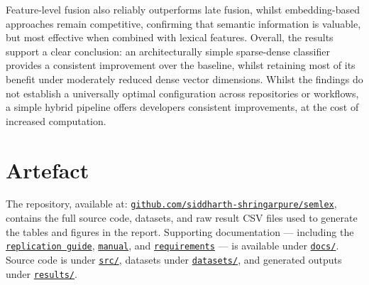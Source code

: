 \documentclass[10pt,a4paper]{article}
\begin{document}
Feature-level fusion also reliably outperforms late fusion, whilst embedding-based approaches remain competitive, confirming that semantic information is valuable, but most effective when combined with lexical features. Overall, the results support a clear conclusion: an architecturally simple sparse-dense classifier provides a consistent improvement over the baseline, whilst retaining most of its benefit under moderately reduced dense vector dimensions. Whilst the findings do not establish a universally optimal configuration across repositories or workflows, a simple hybrid pipeline offers developers consistent improvements, at the cost of increased computation.


\section{Artefact}

The repository, available at: \href{https://github.com/siddharth-shringarpure/semlex}{\texttt{github.com/siddharth-shringarpure/semlex}}, contains the full source code, datasets, and raw result CSV files used to generate the tables and figures in the report. Supporting documentation --- including the
\href{https://github.com/siddharth-shringarpure/semlex/blob/main/replication.pdf}{\texttt{replication guide}}, 
\href{https://github.com/siddharth-shringarpure/semlex/blob/main/manual.pdf}{\texttt{manual}}, and 
\href{https://github.com/siddharth-shringarpure/semlex/blob/main/requirements.pdf}{\texttt{requirements}} --- is available under
\href{https://github.com/siddharth-shringarpure/semlex/tree/main/docs}{\texttt{docs/}}. Source code is under
\href{https://github.com/siddharth-shringarpure/semlex/tree/main/src}{\texttt{src/}}, datasets under 
\href{https://github.com/siddharth-shringarpure/semlex/tree/main/datasets}{\texttt{datasets/}}, and generated outputs under 
\href{https://github.com/siddharth-shringarpure/semlex/tree/main/results}{\texttt{results/}}.



\end{document}

